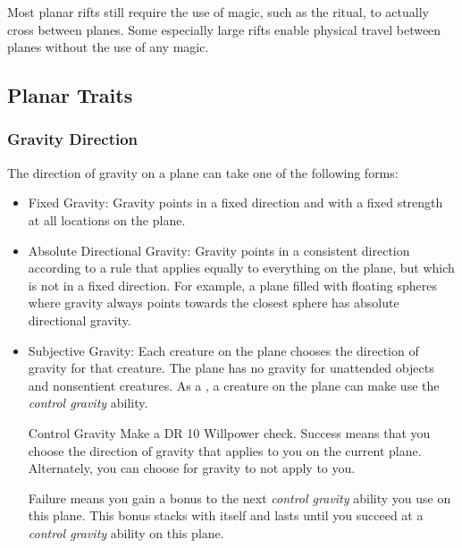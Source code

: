         Most planar rifts still require the use of magic, such as the  ritual, to actually cross between planes.
        Some especially large rifts enable physical travel between planes without the use of any magic.

    \subsection{Planar Traits}
        \subsubsection{Gravity Direction}
            The direction of gravity on a plane can take one of the following forms:
            \begin{itemize}
                \item Fixed Gravity: Gravity points in a fixed direction and with a fixed strength at all locations on the plane.
                \item Absolute Directional Gravity: Gravity points in a consistent direction according to a rule that applies equally to everything on the plane, but which is not in a fixed direction.
                    For example, a plane filled with floating spheres where gravity always points towards the closest sphere has absolute directional gravity.
                \item Subjective Gravity: Each creature on the plane chooses the direction of gravity for that creature.
                    The plane has no gravity for unattended objects and nonsentient creatures.
                    As a , a creature on the plane can make use the \textit{control gravity} ability.
                    \begin{ability}{Control Gravity}
                        Make a DR 10 Willpower check.
                        Success means that you choose the direction of gravity that applies to you on the current plane.
                        Alternately, you can choose for gravity to not apply to you.

                        Failure means you gain a  bonus to the next \textit{control gravity} ability you use on this plane.
                        This bonus stacks with itself and lasts until you succeed at a \textit{control gravity} ability on this plane.
                    \end{ability}
            \end{itemize}

